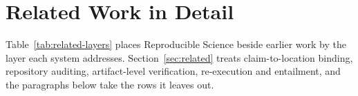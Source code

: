 \section{Related Work in Detail}
\label{sec:related-detail}

Table~\ref{tab:related-layers} places Reproducible Science beside earlier work by the layer each system
addresses. Section~\ref{sec:related} treats claim-to-location binding, repository auditing,
artifact-level verification, re-execution and entailment, and the paragraphs below take the rows it
leaves out.

